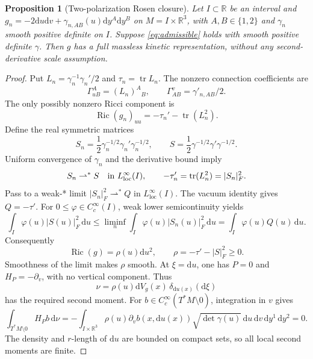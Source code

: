 \documentclass[11pt,a4paper]{article}
\numberwithin{equation}{section}
\newcommand{\Ric}{\operatorname{Ric}}
\newcommand{\tr}{\operatorname{tr}}
\newcommand{\loc}{\mathrm{loc}}
\newcommand{\dd}{\mathrm d}
\newcommand{\R}{\mathbb R}
\newcommand{\f}[2]{\frac{#1}{#2}}
\newtheorem{proposition}[theorem]{Proposition}
\theoremstyle{definition}
\begin{document}
\begin{proposition}[Two-polarization Rosen closure]\label{prop:rosen}
Let $I\subset\R$ be an interval and
$g_n=-2\dd u\dd v+\gamma_{n,AB}(u)\dd y^A\dd y^B$ on
$M=I\times\R^3$, with $A,B\in\{1,2\}$ and $\gamma_n$ smooth
positive definite on $I$. Suppose \eqref{eq:admissible} holds with smooth positive definite $\gamma$. Then $g$ has a full massless kinetic representation, without any second-derivative scale assumption.
\end{proposition}
\begin{proof}
Put $L_n=\gamma_n^{-1}\gamma_n'/2$ and $\tau_n=\tr L_n$. The nonzero connection coefficients are
\begin{equation*}
\Gamma^A_{uB}=(L_n)^A{}_B,\qquad \Gamma^v_{AB}=\gamma'_{n,AB}/2.
\end{equation*}
The only possibly nonzero Ricci component is
\begin{equation*}
\Ric(g_n)_{uu}=-\tau_n'-\tr(L_n^2).
\end{equation*}
Define the real symmetric matrices
\begin{equation*}
S_n=\f12\gamma_n^{-1/2}\gamma_n'\gamma_n^{-1/2},\qquad
S=\f12\gamma^{-1/2}\gamma'\gamma^{-1/2}.
\end{equation*}
Uniform convergence of $\gamma_n$ and the derivative bound imply
\begin{equation*}
S_n\rightharpoonup^* S\quad\hbox{in }L^\infty_{\loc}(I),\qquad
-\tau_n'=\tr(L_n^2)=|S_n|_F^2.
\end{equation*}
Pass to a weak-* limit $|S_n|_F^2\rightharpoonup^*Q$ in
$L^\infty_{\loc}(I)$. The vacuum identity gives $Q=-\tau'$.
For $0\leq\varphi\in C_c^\infty(I)$, weak lower semicontinuity yields
\begin{equation*}
\int_I\varphi(u)|S(u)|_F^2\,\dd u
\leq\liminf_n\int_I\varphi(u)|S_n(u)|_F^2\,\dd u
=\int_I\varphi(u)Q(u)\,\dd u.
\end{equation*}
Consequently
\begin{equation*}
\Ric(g)=\rho(u)\dd u^2,\qquad \rho=-\tau'-|S|_F^2\geq0.
\end{equation*}
Smoothness of the limit makes $\rho$ smooth. At $\xi=\dd u$, one has $P=0$ and $H_P=-\partial_v$, with no vertical component. Thus
\begin{equation*}
\nu=\rho(u)\dd V_g(x)\,\delta_{\dd u(x)}(\dd\xi)
\end{equation*}
has the required second moment. For $b\in C_c^\infty(T^*M\setminus0)$,
integration in $v$ gives
\begin{equation*}
\int_{T^*M\setminus0}H_Pb\,\dd\nu
=-\int_{I\times\R^3}\rho(u)
 \partial_vb(x,\dd u(x))\sqrt{\det\gamma(u)}
 \,\dd u\,\dd v\,\dd y^1\,\dd y^2=0.
\end{equation*}
The density and $r$-length of $\dd u$ are bounded on compact sets,
so all local second moments are finite.
\end{proof}
\end{document}

